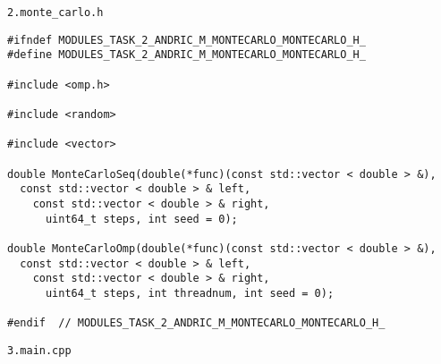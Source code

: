 \documentclass{report}
\begin{document}
\par \verb|2.monte_carlo.h|
\begin{lstlisting}
#ifndef MODULES_TASK_2_ANDRIC_M_MONTECARLO_MONTECARLO_H_
#define MODULES_TASK_2_ANDRIC_M_MONTECARLO_MONTECARLO_H_

#include <omp.h>

#include <random>

#include <vector>

double MonteCarloSeq(double(*func)(const std::vector < double > &),
  const std::vector < double > & left,
    const std::vector < double > & right,
      uint64_t steps, int seed = 0);

double MonteCarloOmp(double(*func)(const std::vector < double > &),
  const std::vector < double > & left,
    const std::vector < double > & right,
      uint64_t steps, int threadnum, int seed = 0);

#endif  // MODULES_TASK_2_ANDRIC_M_MONTECARLO_MONTECARLO_H_
\end{lstlisting}
\par \verb|3.main.cpp|
\end{document}
